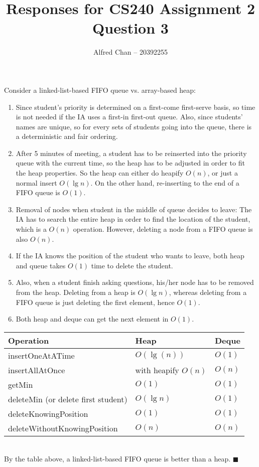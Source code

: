 \documentclass[12pt]{article}
\title{Responses for CS240 Assignment 2 Question 3}
\author{Alfred Chan -- 20392255}
\begin{document}
\maketitle
Consider a linked-list-based FIFO queue vs. array-based heap:
\begin{enumerate}
\item 
Since student's priority is determined on a first-come first-serve basis, so time is not needed if the IA uses a first-in first-out queue.
Also, since students' names are unique, so for every sets of students going into the queue, there is a deterministic and fair ordering.
\item After 5 minutes of meeting, a student has to be reinserted into the priority queue with the current time, so the heap has to be adjusted in order to fit the heap properties.
So the heap can either do heapify $O(n)$, or just a normal insert $O(\lg n)$.
On the other hand, re-inserting to the end of a FIFO queue is $O(1)$.
\item Removal of nodes when student in the middle of queue decides to leave:
The IA has to search the entire heap in order to find the location of the student, which is a $O(n)$ operation.
However, deleting a node from a FIFO queue is also $O(n)$.
\item If the IA knows the position of the student who wants to leave, both heap and queue takes $O(1)$ time to delete the student.
\item Also, when a student finish asking questions, his/her node has to be removed from the heap.
Deleting from a heap is $O(\lg n)$, whereas deleting from a FIFO queue is just deleting the first element, hence $O(1)$.
\item Both heap and deque can get the next element in $O(1)$.
\end{enumerate}

\begin{tabular}{| l | l | l |}
  \hline
	Operation & Heap & Deque\\
  \hline
	insertOneAtATime & $O(\lg(n))$ & $O(1)$\\
	insertAllAtOnce & with heapify $O(n)$ & $O(n)$\\
	getMin & $O(1)$ & $O(1)$\\
	deleteMin (or delete first student)& $O(\lg n)$ & $O(1)$\\
	deleteKnowingPosition & $O(1)$ & $O(1)$\\
	deleteWithoutKnowingPosition & $O(n)$ & $O(n)$\\
  \hline  
\end{tabular}\\
By the table above, a linked-list-based FIFO queue is better than a heap.
\hfill $\blacksquare$
\end{document}
